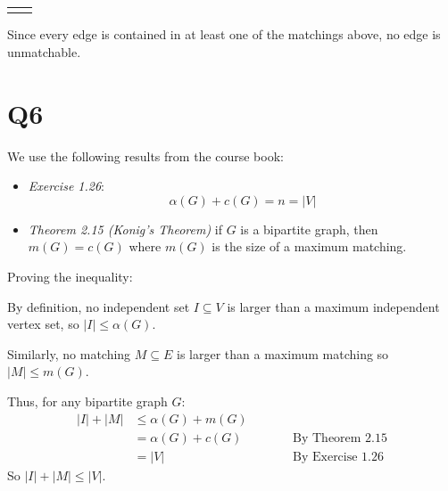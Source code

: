 \documentclass[a4paper, 11pt]{article}
\def\abs#1{\left|#1\right|}
\begin{document}
\begin{multicols*}{2}
\begin{enumerate}[label=(\alph*)]
\begin{center}
\begin{tabular}{cc}
{\begin{tikzpicture}[every node/.style={draw,circle}]
\begin{scope}[rotate=288]
							      \draw[black]  (3) -- (C);
							      \draw[black]  (4) -- (D);
							      \draw[black]  (5) -- (E);
						      \end{scope}
					      \end{tikzpicture}
				      }
			      \end{tabular}
		      \end{center}
		      Since every edge is contained in at least one of the matchings above, no edge is unmatchable.
	\end{enumerate}

	\pagebreak

	\section*{Q6}
	We use the following results from the course book:
	\begin{itemize}
		\item 	\textit{Exercise 1.26}:
		      $$\alpha(G)+c(G)=n=\abs{V}$$


		\item \textit{Theorem 2.15 (Konig's Theorem)} if $G$ is a bipartite graph, then $m(G)=c(G)$ where $m(G)$ is the size of a maximum matching.

	\end{itemize}

	Proving the inequality:
	\begin{mdframed}
		By definition, no independent set $I\subseteq V$ is larger than a maximum independent vertex set, so $|I|\leq\alpha(G)$.

		Similarly, no matching $M\subseteq E$ is larger than a maximum matching so $|M|\leq m(G)$.

		Thus, for any bipartite graph $G$:
		\begin{alignat*}{2}
			|I|+|M| & \leq \alpha(G) + m(G) &        &                         \\
			        & =  \alpha(G)+c(G)     & \qquad & \text{By Theorem 2.15}  \\
			        & = |V|                 & \qquad & \text{By Exercise 1.26}
		\end{alignat*}
		So $|I|+|M| \leq |V|$.
	\end{mdframed}


\end{multicols*}
\end{document}
